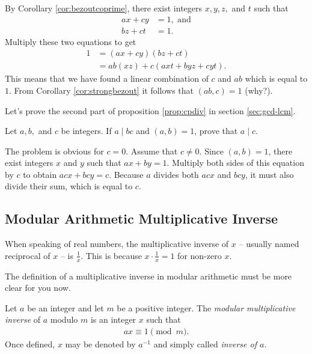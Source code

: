 \documentclass{subfile}
\begin{document}
	\begin{solution}
		By Corollary \ref{cor:bezoutcoprime}, there exist integers $x,y,z,$ and $t$ such that
			\begin{align*}
				ax+cy&=1, \text{ and}\\
				bz+ct&=1.
			\end{align*}
		Multiply these two equations to get
			\begin{align*}
				1 &= (ax+cy)(bz+ct)\\
				  &= ab(xz)+c(axt+byz+cyt).
			\end{align*}
		This means that we have found a linear combination of $c$ and $ab$ which is equal to $1$. From Corollary \ref{cor:strongbezout} it follows that $(ab,c)=1$ (why?).
	\end{solution}
	
	Let's prove the second part of proposition \eqref{prop:cpdiv} in section \eqref{sec:gcd-lcm}.
	
	\begin{problem}\label{prob:a|bc}
		Let $a,b,$ and $c$ be integers. If $a\mid bc$ and $(a,b)=1$, prove that $a\mid c$.
	\end{problem}
	
	\begin{solution}
		The problem is obvious for $c=0$. Assume that $c \neq 0$. Since $(a,b)=1$, there exist integers $x$ and $y$ such that $ax+by=1$. Multiply both sides of this equation by $c$ to obtain $acx+bcy=c$. Because $a$ divides both $acx$ and $bcy$, it must also divide their sum, which is equal to $c$.
		 
	\end{solution}
	
	\subsection{Modular Arithmetic Multiplicative Inverse}\label{sec:arithinverse}
	
	When speaking of real numbers, the multiplicative inverse of $x$ -- usually named reciprocal of $x$ -- is $\frac{1}{x}$. This is because $x \cdot \frac{1}{x} = 1$ for non-zero $x$.
	
	The definition of a multiplicative inverse in modular arithmetic must be more clear for you now.
	
	\begin{definition}
		Let $a$ be an integer and let $m$ be a positive integer. The \textit{modular multiplicative inverse} of $a$ modulo $m$ is an integer $x$ such that
		\begin{align*}
		ax \equiv 1 \pmod m.
		\end{align*}
		Once defined, $x$ may be denoted by $a^{-1}$ and simply called \textit{inverse of $a$}.
	\end{definition}
	
\end{document}
